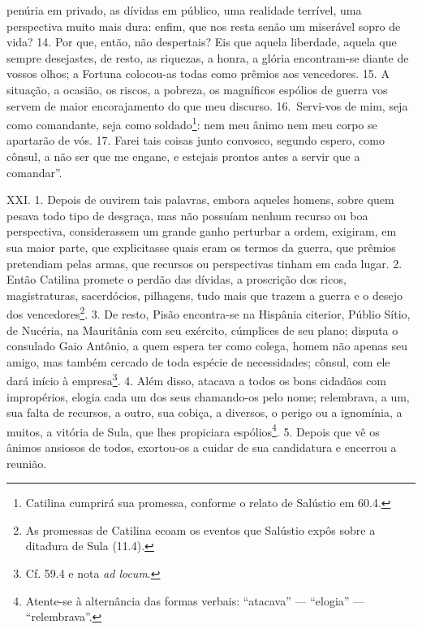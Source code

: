 penúria em privado, as dívidas em público, uma realidade terrível, uma
perspectiva muito mais dura: enfim, que nos resta senão um miserável sopro de
vida? 14. Por que, então, não despertais? Eis que aquela liberdade, aquela que
sempre desejastes, de resto, as riquezas, a honra, a glória encontram-se diante
de vossos olhos; a Fortuna colocou-as todas como prêmios aos vencedores. 15. A
situação, a ocasião, os riscos, a pobreza, os magníficos espólios de guerra vos
servem de maior encorajamento do que meu discurso. 16.~Servi-vos de mim, seja
como comandante, seja como soldado\footnote{Catilina cumprirá sua promessa,
conforme o relato de Salústio em 60.4.}: nem meu ânimo nem meu corpo se
apartarão de vós. 17. Farei tais coisas junto convosco, segundo espero, como
cônsul, a não ser que me engane, e estejais prontos antes a servir que a
comandar”.

XXI. 1. Depois de ouvirem tais palavras, embora aqueles  homens, sobre quem pesava todo tipo de desgraça, mas não possuíam  nenhum recurso ou boa perspectiva,
considerassem um grande ganho perturbar a ordem, exigiram, em sua maior parte, que
explicitasse quais eram os termos da guerra, que prêmios pretendiam pelas
armas, que recursos ou perspectivas tinham em cada lugar. 2. Então Catilina
promete o perdão das dívidas, a proscrição dos ricos, magistraturas,
sacerdócios, pilhagens, tudo mais que trazem a guerra e o desejo dos
vencedores\footnote{As promessas de Catilina ecoam os eventos que Salústio
expôs sobre a ditadura de Sula (11.4).}. 3. De resto, Pisão encontra-se na
Hispânia citerior, Públio Sítio, de Nucéria, na Mauritânia com seu exército,
cúmplices de seu plano; disputa o consulado Gaio Antônio, a quem espera ter
como colega, homem não apenas seu amigo, mas também cercado de toda espécie de
necessidades; cônsul, com ele dará início à empresa\footnote{Cf. 59.4 e nota \emph{ad locum}.}. 4.
Além disso, atacava a todos os bons cidadãos com impropérios, elogia cada um
dos seus chamando-os pelo nome; relembrava, a um, sua falta de recursos,
a outro, sua cobiça, a diversos, o perigo ou a ignomínia, a muitos, a vitória
de Sula, que lhes propiciara espólios\footnote{Atente-se à alternância das formas
verbais: ``atacava'' --- ``elogia'' --- ``relembrava''.}. 5. Depois que vê os ânimos ansiosos de
todos, exortou-os a cuidar de sua candidatura e encerrou a reunião.

